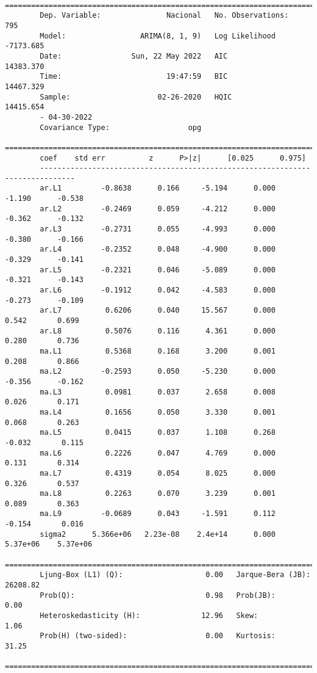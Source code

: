\documentclass[11pt,letterpaper]{article}
\theoremstyle{definition}
\theoremstyle{theorem}
\theoremstyle{remark}
\begin{document}
	\begin{verbatim}
		==============================================================================
		Dep. Variable:               Nacional   No. Observations:                  795
		Model:                 ARIMA(8, 1, 9)   Log Likelihood               -7173.685
		Date:                Sun, 22 May 2022   AIC                          14383.370
		Time:                        19:47:59   BIC                          14467.329
		Sample:                    02-26-2020   HQIC                         14415.654
		- 04-30-2022
		Covariance Type:                  opg
		==============================================================================
		coef    std err          z      P>|z|      [0.025      0.975]
		------------------------------------------------------------------------------
		ar.L1         -0.8638      0.166     -5.194      0.000      -1.190      -0.538
		ar.L2         -0.2469      0.059     -4.212      0.000      -0.362      -0.132
		ar.L3         -0.2731      0.055     -4.993      0.000      -0.380      -0.166
		ar.L4         -0.2352      0.048     -4.900      0.000      -0.329      -0.141
		ar.L5         -0.2321      0.046     -5.089      0.000      -0.321      -0.143
		ar.L6         -0.1912      0.042     -4.583      0.000      -0.273      -0.109
		ar.L7          0.6206      0.040     15.567      0.000       0.542       0.699
		ar.L8          0.5076      0.116      4.361      0.000       0.280       0.736
		ma.L1          0.5368      0.168      3.200      0.001       0.208       0.866
		ma.L2         -0.2593      0.050     -5.230      0.000      -0.356      -0.162
		ma.L3          0.0981      0.037      2.658      0.008       0.026       0.171
		ma.L4          0.1656      0.050      3.330      0.001       0.068       0.263
		ma.L5          0.0415      0.037      1.108      0.268      -0.032       0.115
		ma.L6          0.2226      0.047      4.769      0.000       0.131       0.314
		ma.L7          0.4319      0.054      8.025      0.000       0.326       0.537
		ma.L8          0.2263      0.070      3.239      0.001       0.089       0.363
		ma.L9         -0.0689      0.043     -1.591      0.112      -0.154       0.016
		sigma2      5.366e+06   2.23e-08    2.4e+14      0.000    5.37e+06    5.37e+06
		===================================================================================
		Ljung-Box (L1) (Q):                   0.00   Jarque-Bera (JB):             26208.82
		Prob(Q):                              0.98   Prob(JB):                         0.00
		Heteroskedasticity (H):              12.96   Skew:                             1.06
		Prob(H) (two-sided):                  0.00   Kurtosis:                        31.25
		===================================================================================\end{verbatim}
\end{document}
